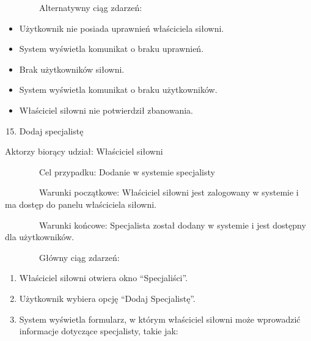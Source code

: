 \documentclass[
]{article}
\providecommand{\tightlist}{%
  \setlength{\itemsep}{0pt}\setlength{\parskip}{0pt}}
\begin{document}
{~~~~~~~~Alternatywny ciąg zdarzeń:}

\begin{itemize}
\tightlist
\item
  {Użytkownik nie posiada uprawnień właściciela siłowni.}
\end{itemize}

\begin{itemize}
\tightlist
\item
  {System wyświetla komunikat o braku uprawnień.}
\end{itemize}

\begin{itemize}
\tightlist
\item
  {Brak użytkowników siłowni.}
\end{itemize}

\begin{itemize}
\tightlist
\item
  {System wyświetla komunikat o braku użytkowników.}
\end{itemize}

\begin{itemize}
\tightlist
\item
  {Właściciel siłowni nie potwierdził zbanowania.\\
  }
\end{itemize}

{}

{}

{}

{}

{}

{}

{}

\begin{enumerate}
\setcounter{enumi}{14}
\tightlist
\item
  {Dodaj specjalistę}
\end{enumerate}

{Aktorzy biorący udział: Właściciel siłowni}

{~~~~~~~~Cel przypadku: Dodanie w systemie specjalisty}

{~~~~~~~~Warunki początkowe: Właściciel siłowni jest zalogowany w
systemie i ma dostęp do panelu właściciela siłowni.}

{~~~~~~~~Warunki końcowe: Specjalista został dodany w systemie i jest
dostępny dla użytkowników.}

{~~~~~~~~Główny ciąg zdarzeń:}

\begin{enumerate}
\tightlist
\item
  {Właściciel siłowni otwiera okno ``Specjaliści''.}
\item
  {Użytkownik wybiera opcję ``Dodaj Specjalistę''.}
\item
  {System wyświetla formularz, w którym właściciel siłowni może
  wprowadzić informacje dotyczące specjalisty, takie jak:}
\end{enumerate}
\end{document}
